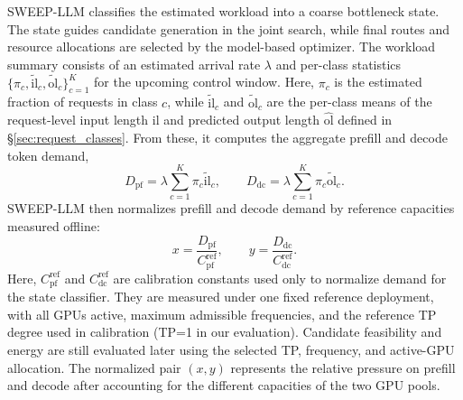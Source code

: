 SWEEP-LLM classifies the estimated workload into a coarse bottleneck state.
The state guides candidate generation in the joint search, while final routes and resource allocations are selected by the model-based optimizer.
The workload summary consists of an estimated arrival rate $\lambda$ and per-class statistics $\{\pi_c,\tilde{\mathrm{il}}_c,\tilde{\mathrm{ol}}_c\}_{c=1}^{K}$ for the upcoming control window.
Here, $\pi_c$ is the estimated fraction of requests in class $c$, while $\tilde{\mathrm{il}}_c$ and $\tilde{\mathrm{ol}}_c$ are the per-class means of the request-level input length $\mathrm{il}$ and predicted output length $\widehat{\mathrm{ol}}$ defined in \S\ref{sec:request_classes}.
From these, it computes the aggregate prefill and decode token demand,
\begin{equation}
D_{\mathrm{pf}} = \lambda \sum_{c=1}^{K} \pi_c \tilde{\mathrm{il}}_c,
\qquad
D_{\mathrm{dc}} = \lambda \sum_{c=1}^{K} \pi_c \tilde{\mathrm{ol}}_c.
\label{eq:token_demands}
\end{equation}
SWEEP-LLM then normalizes prefill and decode demand by reference capacities measured offline:
\begin{equation}
x = \frac{D_{\mathrm{pf}}}{C_{\mathrm{pf}}^{\mathrm{ref}}},
\qquad
y = \frac{D_{\mathrm{dc}}}{C_{\mathrm{dc}}^{\mathrm{ref}}}.
\label{eq:normalized_demand}
\end{equation}
Here, $C_{\mathrm{pf}}^{\mathrm{ref}}$ and $C_{\mathrm{dc}}^{\mathrm{ref}}$ are calibration constants used only to normalize demand for the state classifier.
They are measured under one fixed reference deployment, with all GPUs active, maximum admissible frequencies, and the reference TP degree used in calibration (TP=1 in our evaluation).
Candidate feasibility and energy are still evaluated later using the selected TP, frequency, and active-GPU allocation.
The normalized pair $(x,y)$ represents the relative pressure on prefill and decode after accounting for the different capacities of the two GPU pools.

